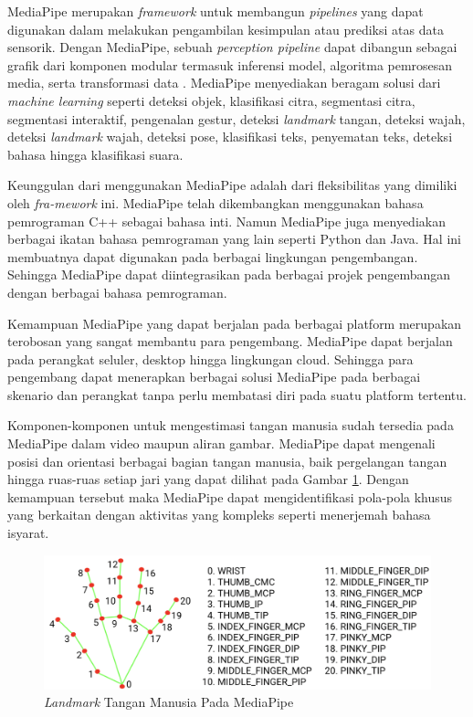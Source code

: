 MediaPipe merupakan \emph{framework} untuk membangun \emph{pipelines} yang dapat digunakan dalam melakukan pengambilan kesimpulan atau prediksi atas data sensorik. Dengan MediaPipe, sebuah \emph{perception pipeline} dapat dibangun sebagai grafik dari komponen modular termasuk inferensi model, algoritma pemrosesan media, serta transformasi data \parencite{lugaresi2019mediapipe}. MediaPipe menyediakan beragam solusi dari \emph{machine learning} seperti deteksi objek, klasifikasi citra, segmentasi citra, segmentasi interaktif, pengenalan gestur, deteksi \emph{landmark} tangan, deteksi wajah, deteksi \emph{landmark} wajah, deteksi pose, klasifikasi teks, penyematan teks, deteksi bahasa hingga klasifikasi suara.

Keunggulan dari menggunakan MediaPipe adalah dari fleksibilitas yang dimiliki oleh \emph{fra-mework} ini. MediaPipe telah dikembangkan menggunakan bahasa pemrograman C++ sebagai bahasa inti. Namun MediaPipe juga menyediakan berbagai ikatan bahasa pemrograman yang lain seperti Python dan Java. Hal ini membuatnya dapat digunakan pada berbagai lingkungan pengembangan. Sehingga MediaPipe dapat diintegrasikan pada berbagai projek pengembangan dengan berbagai bahasa pemrograman.

Kemampuan MediaPipe yang dapat berjalan pada berbagai platform merupakan terobosan yang sangat membantu para pengembang. MediaPipe dapat berjalan pada perangkat seluler, desktop hingga lingkungan cloud. Sehingga para pengembang dapat menerapkan berbagai solusi MediaPipe pada berbagai skenario dan perangkat tanpa perlu membatasi diri pada suatu platform tertentu.

Komponen-komponen untuk mengestimasi tangan manusia sudah tersedia pada MediaPipe dalam video maupun aliran gambar. MediaPipe dapat mengenali posisi dan orientasi berbagai bagian tangan manusia, baik pergelangan tangan hingga ruas-ruas setiap jari yang dapat dilihat pada Gambar \ref{fig:handLandmark}. Dengan kemampuan tersebut maka MediaPipe dapat mengidentifikasi pola-pola khusus yang berkaitan dengan aktivitas yang kompleks seperti menerjemah bahasa isyarat.

\begin{figure} [ht] \centering
    \includegraphics[scale=0.4]{gambar/handLandmark.png}
    \caption{\emph{Landmark} Tangan Manusia Pada MediaPipe}
    \label{fig:handLandmark}
\end{figure}
\newpage

